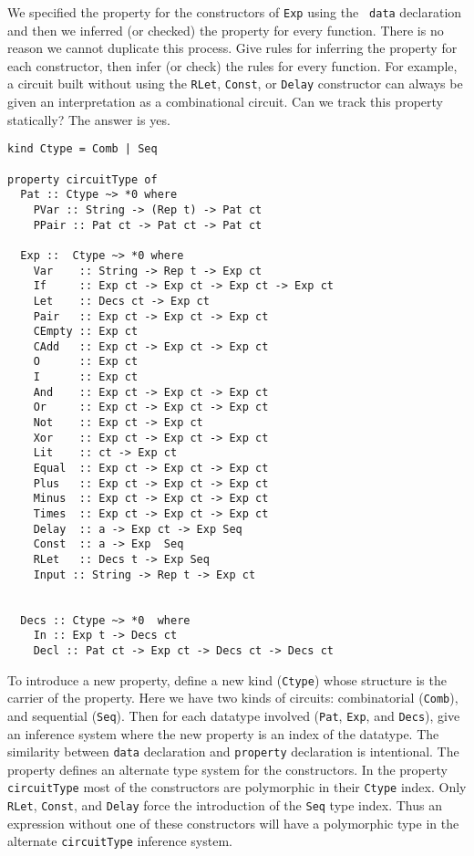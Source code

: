 \documentclass[10pt,twoside]{article}
\begin{document}
We specified the property for the constructors of {\tt Exp} using the {\tt
data} declaration and then we inferred (or checked) the property for every
function. There is no reason we cannot duplicate this process. Give rules
for inferring the property for each constructor, then infer (or check)
the rules for every function. For example, a circuit built without
using the {\tt RLet}, {\tt Const}, or {\tt Delay} constructor
can always be given an interpretation as a combinational circuit. Can we track
this property statically? The answer is yes.

\begin{verbatim}
kind Ctype = Comb | Seq 

property circuitType of 
  Pat :: Ctype ~> *0 where
    PVar :: String -> (Rep t) -> Pat ct
    PPair :: Pat ct -> Pat ct -> Pat ct
  
  Exp ::  Ctype ~> *0 where
    Var    :: String -> Rep t -> Exp ct
    If     :: Exp ct -> Exp ct -> Exp ct -> Exp ct
    Let    :: Decs ct -> Exp ct
    Pair   :: Exp ct -> Exp ct -> Exp ct
    CEmpty :: Exp ct
    CAdd   :: Exp ct -> Exp ct -> Exp ct
    O      :: Exp ct
    I      :: Exp ct
    And    :: Exp ct -> Exp ct -> Exp ct
    Or     :: Exp ct -> Exp ct -> Exp ct
    Not    :: Exp ct -> Exp ct
    Xor    :: Exp ct -> Exp ct -> Exp ct
    Lit    :: ct -> Exp ct
    Equal  :: Exp ct -> Exp ct -> Exp ct
    Plus   :: Exp ct -> Exp ct -> Exp ct
    Minus  :: Exp ct -> Exp ct -> Exp ct
    Times  :: Exp ct -> Exp ct -> Exp ct
    Delay  :: a -> Exp ct -> Exp Seq
    Const  :: a -> Exp  Seq
    RLet   :: Decs t -> Exp Seq
    Input :: String -> Rep t -> Exp ct
  
    
  Decs :: Ctype ~> *0  where
    In :: Exp t -> Decs ct
    Decl :: Pat ct -> Exp ct -> Decs ct -> Decs ct
\end{verbatim}
To introduce a new property, define a new kind ({\tt Ctype}) whose
structure is the carrier of the property. Here we have two
kinds of circuits: combinatorial ({\tt Comb}), and sequential ({\tt Seq}).
Then for each datatype involved ({\tt Pat}, {\tt Exp}, and {\tt Decs}),
give an inference system where the new property is an index of
the datatype. The similarity between {\tt data} declaration and
{\tt property} declaration is intentional. The property defines an alternate
type system for the constructors. In the property {\tt circuitType} most
of the constructors are polymorphic in their {\tt Ctype} index. Only
{\tt RLet}, {\tt Const}, and {\tt Delay} force the introduction
of the {\tt Seq} type index. Thus an expression without one of these
constructors will have a polymorphic type in the alternate {\tt circuitType}
inference system.
\end{document}
